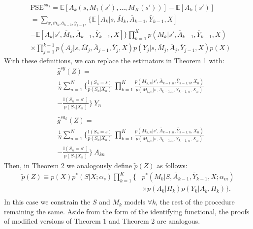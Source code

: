 \documentclass[letterpaper]{article} %
\newcommand{\E}{\mathbb{E}}
\begin{document}
\vspace{-1.5cm}
{\small
\begin{align*}
	&\text{PSE}^{sa_k} = \E[A_k(s,M_1(s'),\ldots,M_K(s'))] - \E[A_k(s')] \\ 
	&= \sum_{x,\overline{m}_k,\overline{a}_{k-1},\overline{y}_{k-1},} \{ \E[A_k | s,\overline{M}_k, \overline{A}_{k-1},\overline{Y}_{k-1},X]\\
	&- \E[A_k | s', \overline{M}_k, \overline{A}_{k-1},\overline{Y}_{k-1},X] \} \prod_{k=1}^K p(M_k | s',\overline{A}_{k-1},\overline{Y}_{k-1},X)\\
	&\times \prod_{j=1}^{k-1} p(A_j | s, \overline{M}_j,\overline{A}_{j-1},\overline{Y}_{j},X) p(Y_j | s,\overline{M}_j,\overline{A}_{j},\overline{Y}_{j-1},X) p(X)
\end{align*}
}%
With these definitions, we can replace the estimators in Theorem 1 with:
{\small
	\begin{align*}
	&\widehat{g}^{sy}(Z) = \\ \nonumber 
	&\frac{1}{N} \sum_{n=1}^{N} \Big\{ \frac{\mathbb{I}(S_n = s)}{p(S_n | X_n)} \ \prod_{k=1}^K \frac{p(M_{k,n} | s', \overline{A}_{k-1,n},\overline{Y}_{k-1,n}, X_n)}{p(M_{k,n} | s, \overline{A}_{k-1,n},\overline{Y}_{k-1,n}, X_n)}\\
	&- \frac{\mathbb{I}(S_n = s')}{p(S_n | X_n)} \Big\} \ Y_n 
	\\  \\
	&\widehat{g}^{sa_k}(Z) =\\ \nonumber 
	&\frac{1}{N} \sum_{n=1}^{N} \Big\{ \frac{\mathbb{I}(S_n = s)}{p(S_n | X_n)} \ \prod_{k=1}^K \frac{p(M_{k,n} | s', \overline{A}_{k-1,n},\overline{Y}_{k-1,n}, X_n)}{p(M_{k,n} | s, \overline{A}_{k-1,n},\overline{Y}_{k-1,n}, X_n)} \\
	&- \frac{\mathbb{I}(S_n = s')}{p(S_n | X_n)} \Big\} \ A_{kn} \nonumber
	\end{align*}
}%
Then, in Theorem 2 we analogously define $\tilde{p}(Z)$ as follows:
{\small
	\begin{align*}
	\tilde{p}(Z) \equiv p(X)p^*(S|X;\alpha_s) \prod_{k=1}^K \Big\{ &p^*(M_k|S,\overline{A}_{k-1},\overline{Y}_{k-1},X;\alpha_{m})\\
	&\times p(A_k|H_k) p(Y_k|A_k,H_k) \Big\}.\\
	\end{align*}
}%
In this case we constrain the $S$ and $M_k$ models $\forall k$, the rest of the procedure remaining the same.
Aside from the form of the identifying functional, the proofs of modified versions of Theorem 1 and Theorem 2 are analogous.

{\small
	
	
}
\end{document}
